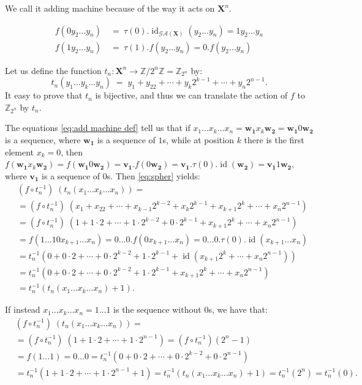 \documentclass[mat1]{fmfdeloTS2.0}
\newcommand{\Z}{\mathbb Z}
\newcommand{\obs}{}				%
\newcommand{\word}{\mathbf}				%
\newcommand{\abece}{\mathbf{X}}			%
\newcommand{\synaut}{\mathcal{GA}}	%
\DeclareMathOperator{\id}{\mathrm{id}}			%
\begin{document}
We call it adding machine because of the way it acts on $\abece^n$.

\begin{equation}
\begin{split}
f(0y_2\ldots y_n)\:&=\:\tau(0).\id_{\synaut(\abece)}(y_2\ldots y_n)=1y_2\ldots y_n\\
f(1y_2\ldots y_n)\:&=\:\tau(1).f(y_2\ldots y_n)=0.f(y_2\ldots y_n)
\end{split}
\label{eq:add machine def}
\end{equation}


Let us define the function $t_n:\abece^n\longrightarrow\Z/2^n\Z=\Z_{2^n}$ by:
\begin{equation}
t_n(y_1\ldots y_k\ldots y_n)\;=\; y_1+y_22+\cdots+y_{k}2^{k-1}+\cdots+y_n2^{n-1}.
\label{eq:spher}
\end{equation}
It easy to prove that $t_n$ is bijective, and thus we can translate the action of $f$ to $\Z_{2^n}$ by $t_n$.

The equations \eqref{eq:add machine def} tell us that if $x_1\ldots x_k\ldots x_n=\word{w_1}x_k\word{w_2}=\word{w_1}0\word{w_2}$ is a sequence, where $\word{w_1}$ is a sequence of $1$s, while at position $k$ there is the \obs{first element} $x_k=0$, then $f(\word{w_1}x_k\word{w_2})=f(\word{w_1}0\word{w_2})=\word{v_1}.f(0\word{w_2})=\word{v_1}.\tau(0).\id(\word{w_2})=\word{v_1}1\word{w_2}$, where $\word{v_1}$ is a sequence of $0$s. Then \eqref{eq:spher} yields:
\begin{align*}
&(f\circ t_{n}^{-1})  \;	(t_n(x_1\ldots x_k\ldots x_n))=\\
&=(f\circ t_{n}^{-1})  \;	(x_1+x_22+\cdots+x_{k-1}2^{k-2}+x_{k}2^{k-1}+x_{k+1}2^{k}+\cdots+x_n2^{n-1})\\
&=(f\circ t_{n}^{-1}) \;	(1+1\cdot2+\cdots+1\cdot2^{k-2}+0\cdot2^{k-1}+x_{k+1}2^{k}+\cdots+x_n2^{n-1})\\
&=f(1\ldots 10x_{k+1}\ldots x_n)=0\ldots0.f(0x_{k+1}\ldots x_n)=0\ldots0.\tau(0).\id(x_{k+1}\ldots x_n)\\
&=t_{n}^{-1}(0+0\cdot2+\cdots+0\cdot2^{k-2}+ 1\cdot2^{k-1}+ \id(x_{k+1}2^{k}+\cdots+x_n2^{n-1}))\\
&=t_{n}^{-1}(0+0\cdot2+\cdots+0\cdot2^{k-2}+ 1\cdot2^{k-1}+ x_{k+1}2^{k}+\cdots+x_n2^{n-1})\\
&=t_{n}^{-1}(t_n(x_1\ldots x_k\ldots x_n)+1).
\end{align*}

If instead $x_1\ldots x_k\ldots x_n=1\ldots1$ is the sequence without $0$s, we have that:
\begin{align*}
&(f\circ t_n^{-1})  \;	(t_n(x_1\ldots x_k\ldots x_n))=\\
&=(f\circ t_n^{-1}) \;	(1+1\cdot2+\cdots+1\cdot2^{n-1})=(f\circ t_{n}^{-1})(2^n-1)\\
&=f(1\ldots1)=	0\ldots 0=t_{n}^{-1}(0+0\cdot2+\cdots+0\cdot2^{k-2}+ 0\cdot2^{n-1})\\
&=t_{n}^{-1}(1+1\cdot2+\cdots+1\cdot2^{n-1}+1)=t_{n}^{-1}(t_n(x_1\ldots x_k\ldots x_n)+1)=t_{n}^{-1}(2^n)=t_{n}^{-1}(0).
\end{align*}
\end{document}
